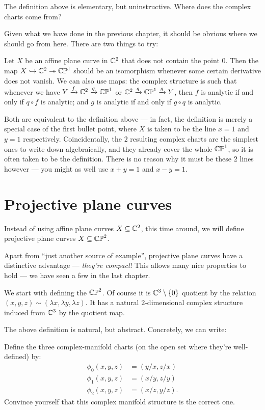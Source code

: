 The definition above is elementary, but uninstructive. Where does the complex charts come from?

Given what we have done in the previous chapter, it should be obvious where we should go from here.
There are two things to try:

\begin{itemize}
	\ii Let $X$ be an affine plane curve in $\mathbb C^2$ that does not contain the point $0$.
	Then the map $X \hookrightarrow \mathbb C^2 \twoheadrightarrow \mathbb{CP}^1$ should be an isomorphism whenever some certain
	derivative does not vanish.
	\ii We can also use maps: the complex structure is such that whenever we have $Y \xrightarrow{f} \mathbb C^2
	\xrightarrow{q} \mathbb{CP}^1$ or $\mathbb C^2 \xrightarrow{q} \mathbb{CP}^1 \xrightarrow{g} Y$, then $f$ is analytic if and only if $q
	\circ f$ is analytic; and $g$ is analytic if and only if $g \circ q$ is analytic.
\end{itemize}

Both are equivalent to the definition above --- in fact, the definition is merely a special case of
the first bullet point, where $X$ is taken to be the line $x = 1$ and $y = 1$ respectively.
Coincidentally, the $2$ resulting complex charts are the simplest ones to write down algebraically,
and they already cover the whole $\mathbb{CP}^1$, so it is often taken to be the definition.
There is no reason why it must be these $2$ lines however --- you might as well use $x + y = 1$ and
$x - y = 1$.

\section{Projective plane curves}

Instead of using affine plane curves $X \subseteq \mathbb C^2$, this time around, we will define
projective plane curves $X \subseteq \mathbb{CP}^2$.

Apart from ``just another source of example'', projective plane curves have a distinctive advantage
--- \emph{they're compact}! This allows many nice properties to hold --- we have seen a few in the
last chapter.

We start with defining the  $\mathbb{CP}^2$.
Of course it is $\mathbb C^3 \setminus \{ 0 \}$ quotient by the relation $(x, y, z) \sim (\lambda x,
\lambda y, \lambda z)$.
It has a natural $2$-dimensional complex structure induced from
$\mathbb C^3$ by the quotient map.

The above definition is natural, but abstract. Concretely, we can write:
\begin{ques}
	Define the three complex-manifold charts (on the open set where they're well-defined) by:
	\begin{align*}
		\phi_0(x, y, z) &= (y/x, z/x) \\
		\phi_1(x, y, z) &= (x/y, z/y) \\
		\phi_2(x, y, z) &= (x/z, y/z).
	\end{align*}
	Convince yourself that this complex manifold structure is the correct one.
\end{ques}

